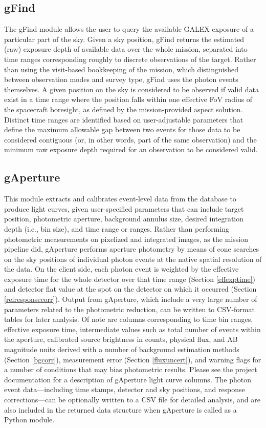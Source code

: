 \documentclass[preprint]{aastex}
\begin{document}
\subsection{gFind}
\label{gfind}
The gFind module allows the user to query the available GALEX exposure of a particular part of the sky. Given a sky position, gFind returns the estimated (raw) exposure depth of available data over the whole mission, separated into time ranges corresponding roughly to discrete observations of the target. Rather than using the visit-based bookkeeping of the mission, which distinguished between observation modes and survey type, gFind uses the photon events themselves. A given position on the sky is considered to be observed if valid data exist in a time range where the position falls within one effective FoV radius of the spacecraft boresight, as defined by the mission-provided aspect solution. Distinct time ranges are identified based on user-adjustable parameters that define the maximum allowable gap between two events for those data to be considered contiguous (or, in other words, part of the same observation) and the minimum raw exposure depth required for an observation to be considered valid.

\subsection{gAperture}
This module extracts and calibrates event-level data from the database to produce light curves, given user-specified parameters that can include target position, photometric aperture, background annulus size, desired integration depth (i.e., bin size), and time range or ranges. Rather than performing photometric measurements on pixelized and integrated images, as the mission pipeline did, gAperture performs aperture photometry by means of cone searches on the sky positions of individual photon events at the native spatial resolution of the data. On the client side, each photon event is weighted by the effective exposure time for the whole detector over that time range (Section \ref{effexptime}) and detector flat value at the spot on the detector on which it occurred (Section \ref{relresponsecorr}). Output from gAperture, which include a very large number of parameters related to the photometric reduction, can be written to CSV-format tables for later analysis. Of note are columns corresponding to time bin ranges, effective exposure time, intermediate values such as total number of events within the aperture, calibrated source brightness in counts, physical flux, and AB magnitude units derived with a number of background estimation methods (Section \ref{bgcorr}), measurement error (Section \ref{fluxuncert}), and warning flags for a number of conditions that may bias photometric results. Please see the project documentation for a description of gAperture light curve columns. The photon event data---including time stamps, detector and sky positions, and response corrections---can be optionally written to a CSV file for detailed analysis, and are also included in the returned data structure when gAperture is called as a Python module.
\end{document}
